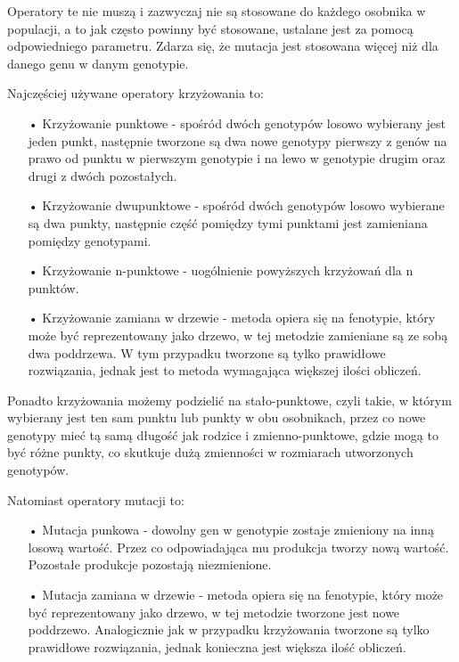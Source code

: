 Operatory te nie muszą i zazwyczaj nie są stosowane do każdego osobnika w populacji, a to jak często powinny być stosowane, ustalane jest za pomocą odpowiedniego parametru. Zdarza się, że mutacja jest stosowana więcej niż dla danego genu w danym genotypie.

Najczęściej używane operatory krzyżowania to:
\begin{itemize}
\item[•] Krzyżowanie punktowe - spośród dwóch genotypów losowo wybierany jest jeden punkt, następnie tworzone są dwa nowe genotypy pierwszy z genów na prawo od punktu w pierwszym genotypie i na lewo w genotypie drugim oraz drugi z dwóch pozostałych.

\item[•] Krzyżowanie dwupunktowe - spośród dwóch genotypów losowo wybierane są dwa punkty, następnie część pomiędzy tymi punktami jest zamieniana pomiędzy genotypami.

\item[•] Krzyżowanie n-punktowe - uogólnienie powyższych krzyżowań dla n punktów.

\item[•] Krzyżowanie zamiana w drzewie - metoda opiera się na fenotypie, który może być reprezentowany jako drzewo, w tej metodzie zamieniane są ze sobą dwa poddrzewa. W tym przypadku tworzone są tylko prawidłowe rozwiązania, jednak jest to metoda wymagająca większej ilości obliczeń.  
\end{itemize}
Ponadto krzyżowania możemy podzielić na stało-punktowe, czyli takie, w którym wybierany jest ten sam punktu lub punkty w obu osobnikach, przez co nowe genotypy mieć tą samą długość jak rodzice i zmienno-punktowe, gdzie mogą to być różne punkty, co skutkuje dużą zmienności w rozmiarach utworzonych genotypów. 

Natomiast operatory mutacji to:
\begin{itemize}
\item[•] Mutacja punkowa - dowolny gen w genotypie zostaje zmieniony na inną losową wartość. Przez co odpowiadająca mu produkcja tworzy nową wartość. Pozostałe produkcje pozostają niezmienione.

\item[•] Mutacja zamiana w drzewie - metoda opiera się na fenotypie, który może być reprezentowany jako drzewo, w tej metodzie tworzone jest nowe poddrzewo. Analogicznie jak w przypadku krzyżowania tworzone są tylko prawidłowe rozwiązania, jednak konieczna jest większa ilość obliczeń. 
\end{itemize}

